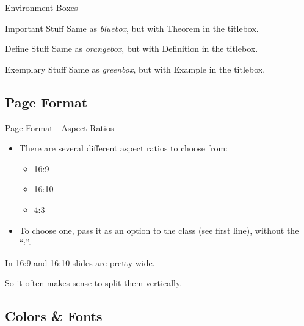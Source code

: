\documentclass[english,169,helvet]{ICEbeamerTUMCD}
\begin{document}
\begin{frame}{Environment Boxes}
    \begin{thmbox}{Important Stuff}
      Same as \emph{bluebox}, but with Theorem in the titlebox.
    \end{thmbox}
    \begin{defbox}{Define Stuff}
      Same as \emph{orangebox}, but with Definition in the titlebox.
    \end{defbox}
    \begin{egbox}{Exemplary Stuff}
      Same as \emph{greenbox}, but with Example in the titlebox.
    \end{egbox}
\end{frame}

\subsection{Page Format}

\begin{frame}{Page Format - Aspect Ratios}
  \begin{itemize}
  \item There are several different aspect ratios to choose from:
    \begin{itemize}
    \item 16:9
    \item 16:10
    \item 4:3
    \end{itemize}
    \item To choose one, pass it as an option to the class (see first line), without the ``:''.
  \end{itemize}
  \begin{minipage}{0.5\linewidth}
    In 16:9 and 16:10 slides are pretty wide.
  \end{minipage}%
  \begin{minipage}{0.5\linewidth}
    So it often makes sense to split them vertically.
  \end{minipage}
\end{frame}

\subsection{Colors \& Fonts}
\end{document}
